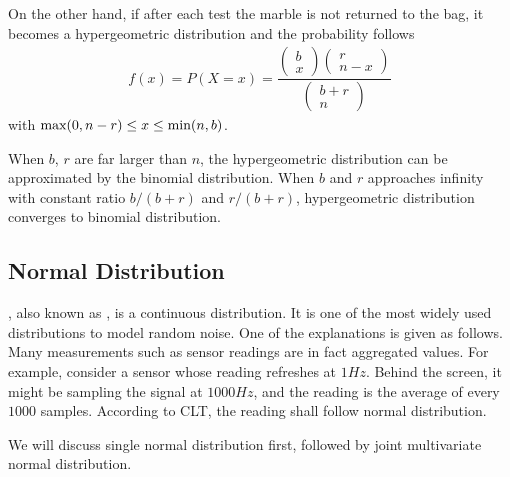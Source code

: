 On the other hand, if after each test the marble is not returned to the bag, it becomes a hypergeometric distribution and the probability follows
\begin{eqnarray}
f(x) = P(X=x) = \dfrac{\left(\begin{array}{c}
                               b \\
                               x
                             \end{array}\right)\left(\begin{array}{c}
                                                       r \\
                                                       n-x
                                                     \end{array}\right)}{\left(\begin{array}{c}
                                                                                 b+r \\
                                                                                 n
                                                                               \end{array}\right)} \nonumber
\end{eqnarray}
with $\textup{max}(0, n-r) \leq x \leq \textup{min}(n, b)$.

When $b$, $r$ are far larger than $n$, the hypergeometric distribution can be approximated by the binomial distribution. When $b$ and $r$ approaches infinity with constant ratio $b/(b+r)$ and $r/(b+r)$, hypergeometric distribution converges to binomial distribution.

\subsection{Normal Distribution}

, also known as , is a continuous distribution. It is one of the most widely used distributions to model random noise. One of the explanations is given as follows. Many measurements such as sensor readings are in fact aggregated values. For example, consider a sensor whose reading refreshes at $1Hz$. Behind the screen, it might be sampling the signal at $1000Hz$, and the reading is the average of every $1000$ samples. According to CLT, the reading shall follow normal distribution.

We will discuss single normal distribution first, followed by joint multivariate normal distribution.

